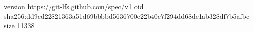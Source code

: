 version https://git-lfs.github.com/spec/v1
oid sha256:dd9cd22821363a51d69bbbbd5636700e22b40c7f294dd68de1ab328df7b5afbc
size 11338
